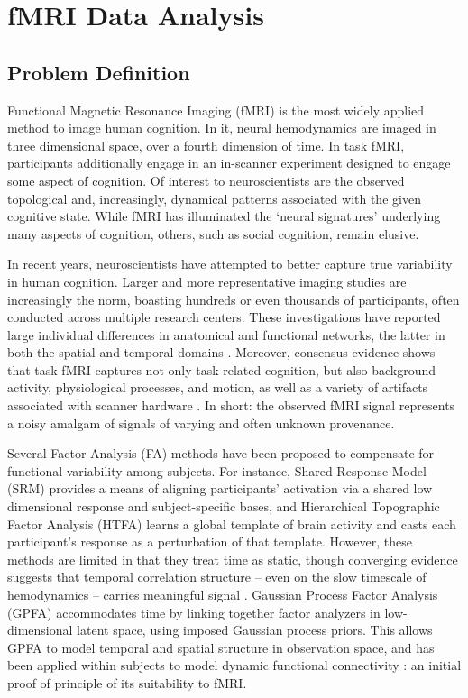 \chapter{fMRI Data Analysis} \label{ch-1}

\section{Problem Definition}

Functional Magnetic Resonance Imaging (fMRI) is the most widely applied method to image human cognition. In it, neural hemodynamics are imaged in three dimensional space, over a fourth dimension of time. In task fMRI, participants additionally engage in an in-scanner experiment designed to engage some aspect of cognition. Of interest to neuroscientists are the observed topological and, increasingly, dynamical patterns associated with the given cognitive state. While fMRI has illuminated the `neural signatures' underlying many aspects of cognition, others, such as social cognition, remain elusive.

In recent years, neuroscientists have attempted to better capture true variability in human cognition. Larger and more representative imaging studies are increasingly the norm, boasting hundreds or even thousands of participants, often conducted across multiple research centers. These investigations have reported large individual differences in anatomical \cite{kanai2011structural} and functional networks, the latter in both the spatial \cite{mueller2013individual} and temporal domains \cite{davison2016individual}. Moreover, consensus evidence shows that task fMRI captures not only task-related cognition, but also background activity, physiological processes, and motion, as well as a variety of artifacts associated with scanner hardware \cite{liu2016noise}. In short: the observed fMRI signal represents a noisy amalgam of signals of varying and often unknown provenance.

Several Factor Analysis (FA) methods have been proposed to compensate for functional variability among subjects. For instance, Shared Response Model (SRM) \cite{srm} provides a means of aligning participants’ activation via a shared low dimensional response and subject-specific bases, and Hierarchical Topographic Factor Analysis (HTFA) \cite{htfa} learns a global template of brain activity and casts each participant’s response as a perturbation of that template. However, these methods are limited in that they treat time as static, though converging evidence suggests that temporal correlation structure -- even on the slow timescale of hemodynamics -- carries meaningful signal \cite{infraslow}. Gaussian Process Factor Analysis (GPFA) \cite{gpfa} accommodates time by linking together factor analyzers in low-dimensional latent space, using imposed Gaussian process priors. This allows GPFA to model temporal and spatial structure in observation space, and has been applied within subjects to model dynamic functional connectivity \cite{lfgp}: an initial proof of principle of its suitability to fMRI.

